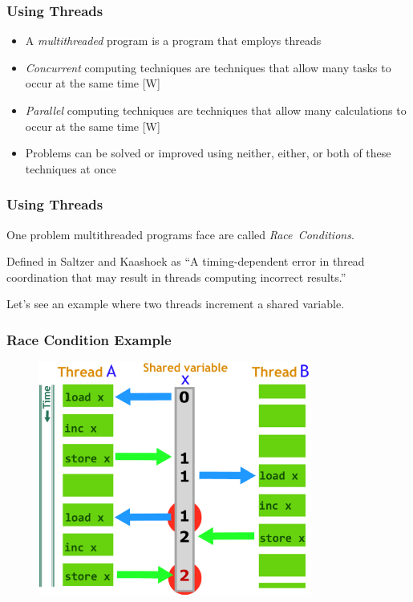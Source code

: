 \documentclass{beamer}
\newcommand{\linespace}{\vskip 0.25cm}
\begin{document}
\begin{frame}
\frametitle{Using Threads}

	\begin{itemize}
  		\item A \emph{multithreaded} program is a program that employs threads
  		
  		\linespace
  		
  		\item \emph{Concurrent} computing techniques are techniques that allow many tasks to occur at the same time [W]
  		
  		\linespace  		
  		
  		\item \emph{Parallel} computing techniques are techniques that allow many calculations to occur at the same time [W]
  		
  		\linespace  		
  		
  		\item Problems can be solved or improved using neither, either, or both of these techniques at once
	  \end{itemize}

\end{frame}


\begin{frame}
\frametitle{Using Threads}

One problem multithreaded programs face are called \emph{Race~Conditions}.

\linespace

Defined in Saltzer and Kaashoek as ``A timing-dependent error in thread coordination that may result in threads computing incorrect results.'' 

\linespace

Let's see an example where two threads increment a shared variable.
\end{frame}

\begin{frame}
\frametitle{Race Condition Example}
	\begin{figure}
		\includegraphics[width=0.8\textwidth]{Illustrations/RaceCondition}
		\label{fig:racecondition}
	\end{figure}

\end{frame}
\end{document}
